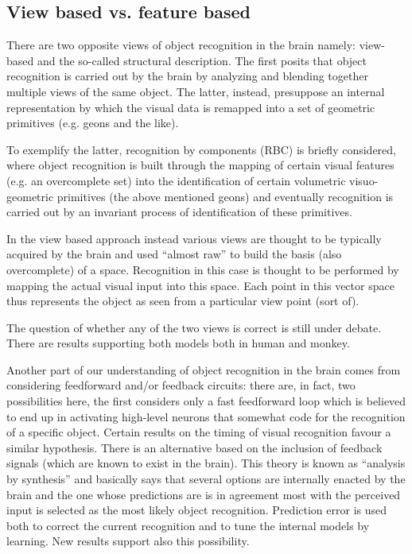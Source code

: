 \subsection{View based vs. feature based}

There are two opposite views of object recognition in the brain namely: view-based and the so-called structural description. The first posits that object recognition is carried out by the brain by analyzing and blending together multiple views of the same object. The latter, instead, presuppose an internal representation by which the visual data is remapped into a set of geometric primitives (e.g. geons and the like).

To exemplify the latter, recognition by components (RBC) is briefly considered, where object recognition is built through the mapping of certain visual features (e.g. an overcomplete set) into the identification of certain volumetric visuo-geometric primitives (the above mentioned geons) and eventually recognition is carried out by an invariant process of identification of these primitives.

In the view based approach instead various views are thought to be typically acquired by the brain and used ``almost raw'' to build the basis (also overcomplete) of a space. Recognition in this case is thought to be performed by mapping the actual visual input into this space. Each point in this vector space thus represents the object as seen from a particular view point (sort of).

The question of whether any of the two views is correct is still under debate. There are results supporting both models both in human and monkey.

Another part of our understanding of object recognition in the brain comes from considering feedforward and/or feedback circuits: there are, in fact, two possibilities here, the first considers only a fast feedforward loop which is believed to end up in activating high-level neurons that somewhat code for the recognition of a specific object. Certain results on the timing of visual recognition favour a similar hypothesis. There is an alternative based on the inclusion of feedback signals (which are known to exist in the brain). This theory is known as ``analysis by synthesis'' and basically says that several options are internally enacted by the brain and the one whose predictions are is in agreement most with the perceived input is selected as the most likely object recognition. Prediction error is used both to correct the current recognition and to tune the internal models by learning. New results support also this possibility.

